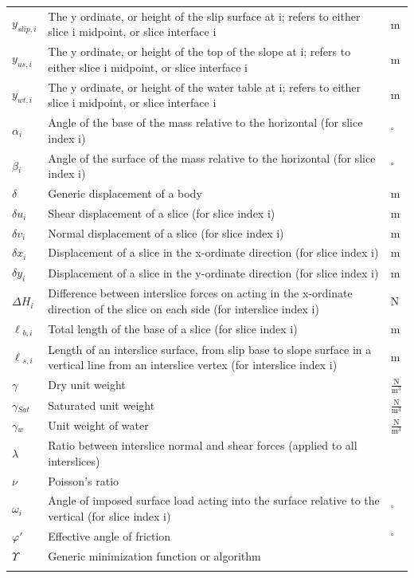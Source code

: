 \documentclass[12pt]{article}
\begin{document}
\begin{longtable*}{l l l}
\\
$y_{slip,i}$ & The y ordinate, or height of the slip surface at i; refers to either slice i midpoint, or slice interface i & m
\\
$y_{us,i}$ & The y ordinate, or height of the top of the slope at i; refers to either slice i midpoint, or slice interface i & m
\\
$y_{wt,i}$ & The y ordinate, or height of the water table at i; refers to either slice i midpoint, or slice interface i & m
\\
$\alpha{}_{i}$ & Angle of the base of the mass relative to the horizontal (for slice index i) & ${}^{\circ}$
\\
$\beta{}_{i}$ & Angle of the surface of the mass relative to the horizontal (for slice index i) & ${}^{\circ}$
\\
$\delta{}$ & Generic displacement of a body & m
\\
$\delta{}u_{i}$ & Shear displacement of a slice (for slice index i) & m
\\
$\delta{}v_{i}$ & Normal displacement of a slice (for slice index i) & m
\\
$\delta{}x_{i}$ & Displacement of a slice in the x-ordinate direction (for slice index i) & m
\\
$\delta{}y_{i}$ & Displacement of a slice in the y-ordinate direction (for slice index i) & m
\\
$\Delta{}H_{i}$ & Difference between interslice forces on acting in the x-ordinate direction of the slice on each side (for interslice index i) & N
\\
$\ell{}_{b,i}$ & Total length of the base of a slice (for slice index i) & m
\\
$\ell{}_{s,i}$ & Length of an interslice surface, from slip base to slope surface in a vertical line from an interslice vertex (for interslice index i) & m
\\
$\gamma{}$ & Dry unit weight & $\frac{\text{N}}{\text{m}^{3}}$
\\
$\gamma{}_{Sat}$ & Saturated unit weight & $\frac{\text{N}}{\text{m}^{3}}$
\\
$\gamma{}_{w}$ & Unit weight of water & $\frac{\text{N}}{\text{m}^{3}}$
\\
$\lambda{}$ & Ratio between interslice normal and shear forces (applied to all interslices) & 
\\
$\nu{}$ & Poisson's ratio & 
\\
$\omega{}_{i}$ & Angle of imposed surface load acting into the surface relative to the vertical (for slice index i) & ${}^{\circ}$
\\
$\varphi{}'$ & Effective angle of friction & ${}^{\circ}$
\\
$\Upsilon{}$ & Generic minimization function or algorithm & 
\\
\bottomrule
\label{Table:TablofSymb}
\end{longtable*}
\end{document}
